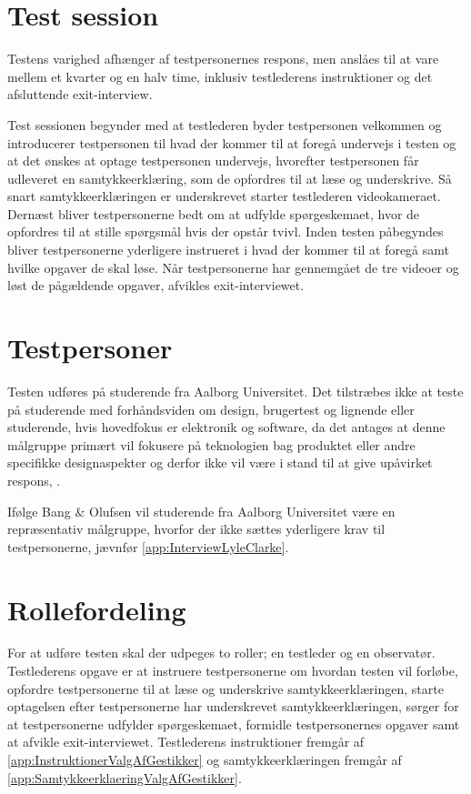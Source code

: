 \section{Test session}
\label{TestSessionValgAfGestikker}
%
Testens varighed afhænger af testpersonernes respons, men anslåes til at vare mellem et kvarter og en halv time, inklusiv testlederens instruktioner og det afsluttende exit-interview.

Test sessionen begynder med at testlederen byder testpersonen velkommen og introducerer testpersonen til hvad der kommer til at foregå undervejs i testen og at det ønskes at optage testpersonen undervejs, hvorefter testpersonen får udleveret en samtykkeerklæring, som de opfordres til at læse og underskrive. Så snart samtykkeerklæringen er underskrevet starter testlederen videokameraet. Dernæst bliver testpersonerne bedt om at udfylde spørgeskemaet, hvor de opfordres til at stille spørgsmål hvis der opstår tvivl. Inden testen påbegyndes bliver testpersonerne yderligere instrueret i hvad der kommer til at foregå samt hvilke opgaver de skal løse. Når testpersonerne har gennemgået de tre videoer og løst de pågældende opgaver, afvikles exit-interviewet. 
%

\section{Testpersoner}
\label{TestpersonerValgAfGestikker}
%
Testen udføres på studerende fra Aalborg Universitet. Det tilstræbes ikke at teste på studerende med forhåndsviden om design, brugertest og lignende eller studerende, hvis hovedfokus er elektronik og software, da det antages at denne målgruppe primært vil fokusere på teknologien bag produktet eller andre specifikke designaspekter og derfor ikke vil være i stand til at give upåvirket respons, \parencite[s. 110]{Book:OUE}. 

Ifølge Bang $\&$ Olufsen vil studerende fra Aalborg Universitet være en repræsentativ målgruppe, hvorfor der ikke sættes yderligere krav til testpersonerne, jævnfør \autoref{app:InterviewLyleClarke}.  
%

\section{Rollefordeling}
\label{RollerfordelingValgAfGestikker}
%
For at udføre testen skal der udpeges to roller; en testleder og en observatør. Testlederens opgave er at instruere testpersonerne om hvordan testen vil forløbe, opfordre testpersonerne til at læse og underskrive samtykkeerklæringen, starte optagelsen efter testpersonerne har underskrevet samtykkeerklæringen, sørger for at testpersonerne udfylder spørgeskemaet, formidle testpersonernes opgaver samt at afvikle exit-interviewet. Testlederens instruktioner fremgår af \autoref{app:InstruktionerValgAfGestikker} og samtykkeerklæringen fremgår af \autoref{app:SamtykkeerklaeringValgAfGestikker}. 

